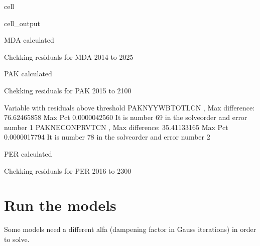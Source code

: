 \documentclass[letterpaper,10pt,english]{jupyterBook}
\begin{document}
\begin{sphinxuseclass}{cell}
\begin{sphinxVerbatimOutput}
\begin{sphinxuseclass}{cell_output}
\begin{sphinxVerbatim}[commandchars=\\\{\}]
MDA calculated  

Chekking residuals for MDA 2014 to 2025
\end{sphinxVerbatim}

\begin{sphinxVerbatim}[commandchars=\\\{\}]
PAK calculated  

Chekking residuals for PAK 2015 to 2100
\end{sphinxVerbatim}

\begin{sphinxVerbatim}[commandchars=\\\{\}]
Variable with residuals above threshold
PAKNYYWBTOTLCN              , Max difference:    76.62465858 Max Pct    0.0000042560\PYGZpc{} It is number    69 in the solveorder and error number 1
PAKNECONPRVTCN              , Max difference:    35.41133165 Max Pct    0.0000017794\PYGZpc{} It is number    78 in the solveorder and error number 2
\end{sphinxVerbatim}

\begin{sphinxVerbatim}[commandchars=\\\{\}]
PER calculated  

Chekking residuals for PER 2016 to 2300
\end{sphinxVerbatim}

\end{sphinxuseclass}\end{sphinxVerbatimOutput}

\end{sphinxuseclass}

\section{Run the models}
\label{\detokenize{content/howto/onboard/eviews/onboard many models from wf1:run-the-models}}
\sphinxAtStartPar
Some models need a different alfa (dampening factor in Gauss iterations) in order to solve.
\end{document}
